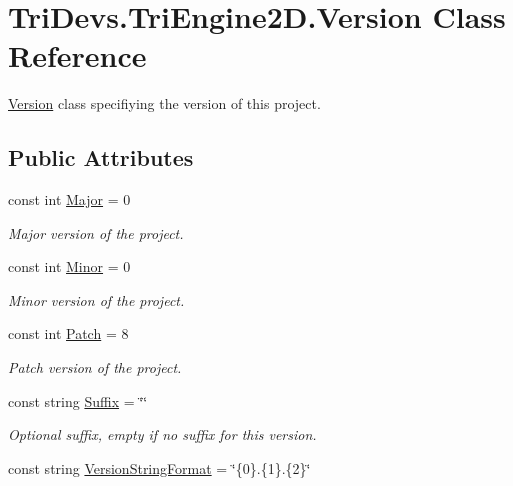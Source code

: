 \hypertarget{class_tri_devs_1_1_tri_engine2_d_1_1_version}{\section{Tri\-Devs.\-Tri\-Engine2\-D.\-Version Class Reference}
\label{class_tri_devs_1_1_tri_engine2_d_1_1_version}
}


\hyperlink{class_tri_devs_1_1_tri_engine2_d_1_1_version}{Version} class specifiying the version of this project.  


\subsection*{Public Attributes}
\begin{DoxyCompactItemize}
\item 
const int \hyperlink{class_tri_devs_1_1_tri_engine2_d_1_1_version_adf7439103e5307870f8a9b953e9f3933}{Major} = 0
\begin{DoxyCompactList}\small\item\em Major version of the project. \end{DoxyCompactList}\item 
const int \hyperlink{class_tri_devs_1_1_tri_engine2_d_1_1_version_a46c99b37d8caad10a9702e9823f6cded}{Minor} = 0
\begin{DoxyCompactList}\small\item\em Minor version of the project. \end{DoxyCompactList}\item 
const int \hyperlink{class_tri_devs_1_1_tri_engine2_d_1_1_version_a5baa982b0404ea5ed3d2526e26f55809}{Patch} = 8
\begin{DoxyCompactList}\small\item\em Patch version of the project. \end{DoxyCompactList}\item 
const string \hyperlink{class_tri_devs_1_1_tri_engine2_d_1_1_version_a5f7a61ae54163decac64e6acbe25e76d}{Suffix} = \char`\"{}\char`\"{}
\begin{DoxyCompactList}\small\item\em Optional suffix, empty if no suffix for this version. \end{DoxyCompactList}\item 
const string \hyperlink{class_tri_devs_1_1_tri_engine2_d_1_1_version_a7ff4d8681e4833ef71067425aac665e4}{Version\-String\-Format} = \char`\"{}\{0\}.\{1\}.\{2\}\char`\"{}

\end{DoxyCompactItemize}
